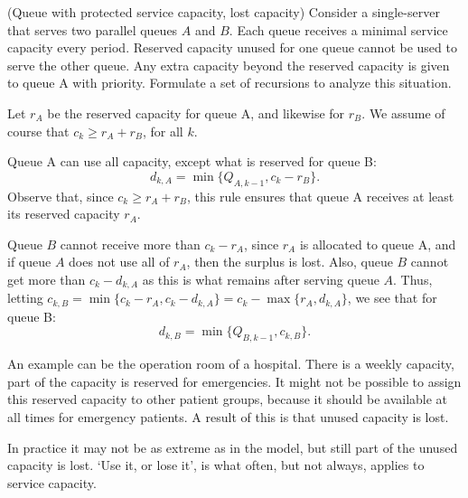 \begin{exercise} 
  (Queue with protected service capacity, lost capacity) Consider a
  single-server that serves two parallel queues $A$ and $B$. Each queue receives a
  minimal service capacity every period. Reserved capacity unused for
  one queue cannot be used to serve the other queue. Any extra
  capacity beyond the reserved capacity is given to queue A with
  priority. Formulate a set of recursions to analyze this situation.

  Let $r_A$ be the reserved capacity for queue A, and likewise for
   $r_B$. We assume of course that $c_k\geq r_A + r_B$, for all $k$.
   \begin{solution} Queue A can use all capacity, except what is
     reserved for queue B:
\begin{equation*}
  d_{k,A} = \min\{Q_{A, k-1}, c_k - r_B\}.
\end{equation*}
Observe that, since $c_k \geq r_A + r_B$, this rule ensures that queue
A receives at least its reserved capacity $r_A$.

Queue $B$ cannot receive more than $c_k-r_A$, since $r_A$ is allocated
to queue A, and if queue $A$ does not use all of $r_A$, then the
surplus is lost. Also, queue $B$ cannot get more than $c_k - d_{k,A}$
as this is what remains after serving queue $A$. Thus, letting
$c_{k,B} = \min\{c_k-r_A, c_k-d_{k,A}\} = c_k - \max\{r_A, d_{k,A}\}$,
we see that for queue B:
\begin{equation*}
  d_{k,B} = \min\{Q_{B, k-1}, c_{k,B}\}.
\end{equation*}

An example can be the operation room of a hospital. There is a weekly
capacity, part of the capacity is reserved for emergencies. It might
not be possible to assign this reserved capacity to other patient
groups, because it should be available at all times for emergency
patients. A result of this is that unused capacity is lost.  

In practice it may not be as extreme as in the model, but still part
of the unused capacity is lost. `Use it, or lose it', is what often,
but not always, applies to service capacity.
  \end{solution}
\end{exercise}




